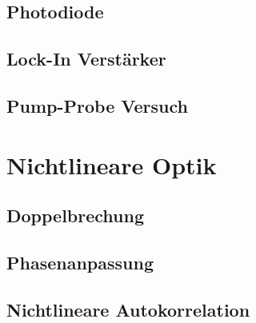     \subsection{Photodiode}


    \subsection{Lock-In Verstärker}


    \subsection{Pump-Probe Versuch}

\section{Nichtlineare Optik}
    \subsection{Doppelbrechung}

    \subsection{Phasenanpassung}

    \subsection{Nichtlineare Autokorrelation}

